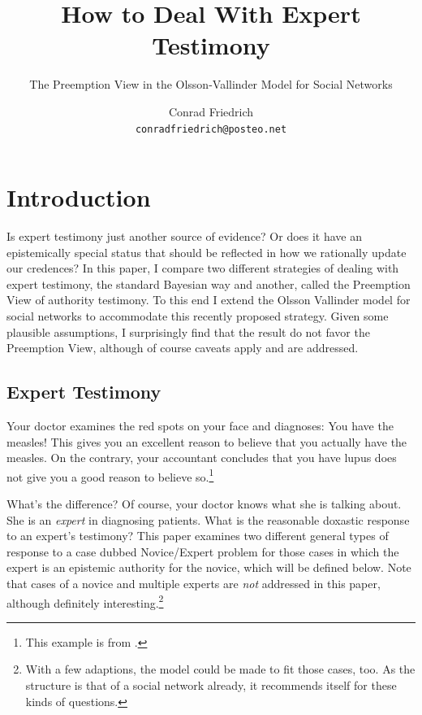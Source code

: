 \documentclass[11pt, a4paper]{scrartcl}
\title{\textbf{How to Deal With Expert Testimony} }
\subtitle{The Preemption View in the Olsson-Vallinder Model for Social Networks }
\author{Conrad Friedrich \\ \texttt{conradfriedrich@posteo.net}}
\renewcommand{\i}[1]{\emph{#1}}
\begin{document}
\maketitle
\thispagestyle{empty}
\tableofcontents
\newpage
\section{Introduction}
Is expert testimony just another source of evidence? Or does it have an epistemically special status that should be reflected in how we rationally update our credences? In this paper, I compare two different strategies of dealing with expert testimony, the standard Bayesian way and another, called the Preemption View of authority testimony. To this end I extend the Olsson Vallinder model for social networks to accommodate this recently proposed strategy. Given some plausible assumptions, I surprisingly find that the result do not favor the Preemption View, although of course caveats apply and are addressed.

\subsection{Expert Testimony}
Your doctor examines the red spots on your face and diagnoses: You have the measles! This gives you an excellent reason to believe that you actually have the measles. On the contrary, your accountant concludes that you have lupus does not give you a good reason to believe so.\footnote{This example is from \textcite{Constantin2017}.}

What's the difference? Of course, your doctor knows what she is talking about. She is an \i{expert} in diagnosing patients. What is the reasonable doxastic response to an expert's testimony? This paper examines two different general types of response to a case dubbed Novice/Expert problem \parencite{Goldman2001} for those cases in which the expert is an epistemic authority for the novice, which will be defined below. Note that cases of a novice and multiple experts are \i{not} addressed in this paper, although definitely interesting.\footnote{With a few adaptions, the model could be made to fit those cases, too. As the structure is that of a social network already, it recommends itself for these kinds of questions.}
\end{document}
